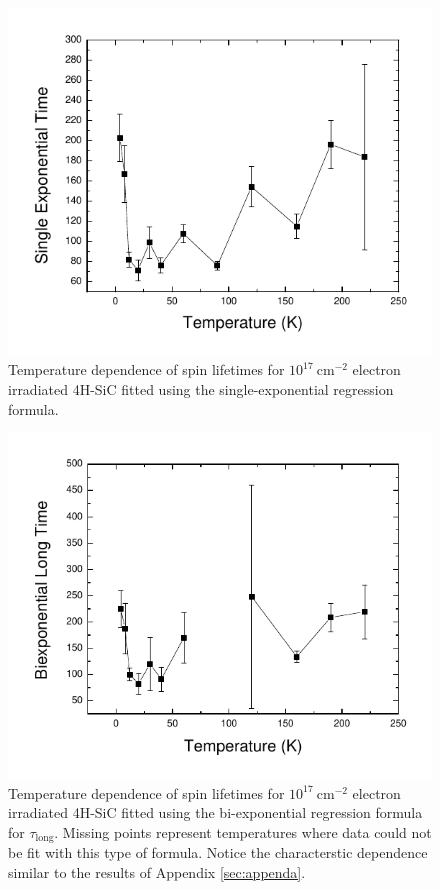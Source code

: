 \documentclass[oneside]{BYUPhys}
\begin{document}
\begin{appendices}
\begin{figure}
    \centerline{\includegraphics{e17-lifetimes-single}}
    \caption[Electron Irradiated SiC Temperature Dependence for Single-Exponential Spin Coherence]{\label{fig:SiCElectronSingle}
     Temperature dependence of spin lifetimes for $10^{17}~\text{cm}^{-2}$ electron irradiated 4H-SiC fitted using the single-exponential regression formula.}
 \end{figure}

\begin{figure}
    \centerline{\includegraphics{e17-lifetimes-bi}}
    \caption[Electron Irradiated SiC Temperature Dependence for Single-Exponential Spin Coherence]{\label{fig:SiCElectronBi}
     Temperature dependence of spin lifetimes for $10^{17}~\text{cm}^{-2}$ electron irradiated 4H-SiC fitted using the bi-exponential regression formula for $\tau_\text{long}$. Missing points represent temperatures where data could not be fit with this type of formula. Notice the characterstic dependence similar to the results of Appendix \ref{sec:appenda}.}
 \end{figure}


\end{appendices}
\end{document}
